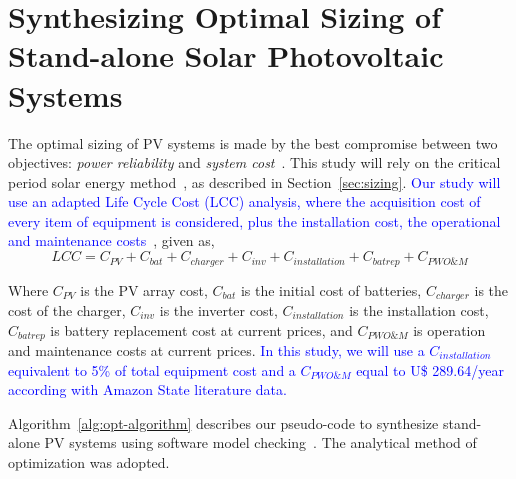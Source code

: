 \documentclass[runningheads]{llncs}
\begin{document}
\section{Synthesizing Optimal Sizing of Stand-alone Solar Photovoltaic Systems}

The optimal sizing of PV systems is made by the best compromise between two objectives: \textit{power reliability} and \textit{system cost}~\cite{Alsadi2018}. This study will rely on the critical period solar energy method~\cite{Pinho}, as described in Section~\ref{sec:sizing}. \textcolor{blue}{Our study will use an adapted Life Cycle Cost (LCC) analysis, where the acquisition cost of every item of equipment is considered, plus the installation cost, the operational and maintenance costs}~\cite{Alsadi2018}, given as,
%
\begin{equation}
\label{eq:LCC}
LCC = C_{PV} + C_{bat} + C_{charger} + C_{inv} + C_{installation} + C_{batrep} + C_{PWO\&M}
\end{equation}

\noindent Where $C_{PV}$ is the PV array cost, $C_{bat}$ is the initial cost of batteries, $C_{charger}$ is the cost of the charger, $C_{inv}$ is the inverter cost, $C_{installation}$ is the installation cost, $C_{batrep}$ is battery replacement cost at current prices, and $C_{PWO\&M}$ is operation and maintenance costs at current prices. \textcolor{blue}{In this study, we will use a $C_{installation}$ equivalent to 5\% of total equipment cost and a $C_{PWO\&M}$ equal to U\$ 289.64/year according with Amazon State literature data\cite{Agrener2013}.}

Algorithm~\ref{alg:opt-algorithm} describes our pseudo-code to synthesize stand-alone PV systems using software model checking~\cite{DBLP:journals/corr/abs-1909-13139}. The analytical method of optimization was adopted.
\end{document}
